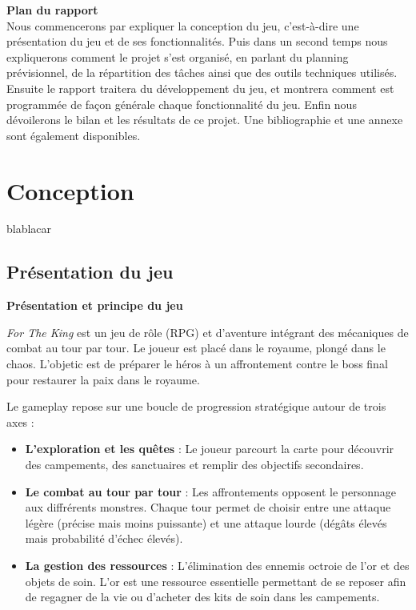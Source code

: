 \documentclass[11pt,a4paper]{article}
\begin{document}
\medskip

\textbf{Plan du rapport} \\
Nous commencerons par expliquer la conception du jeu, c'est-à-dire une présentation du jeu et de ses fonctionnalités.
Puis dans un second temps nous expliquerons comment le projet s'est organisé, en parlant du planning prévisionnel, de la répartition des tâches ainsi que des outils techniques utilisés.
Ensuite le rapport traitera du développement du jeu, et montrera comment est programmée de façon générale chaque fonctionnalité du jeu.
Enfin nous dévoilerons le bilan et les résultats de ce projet.
Une bibliographie et une annexe sont également disponibles.

\section{Conception}

blablacar

\subsection{Présentation du jeu}

\textbf{Présentation et principe du jeu}

\noindent\textit{For The King} est un jeu de rôle (RPG) et d'aventure intégrant des mécaniques de combat au tour par tour. 
Le joueur est placé dans le royaume, plongé dans le chaos. 
L'objetic est de préparer le héros à un affrontement contre le boss final pour restaurer la paix dans le royaume. 

Le gameplay repose sur une boucle de progression stratégique autour de trois axes : 

\begin{itemize}
	\item \textbf{L'exploration et les quêtes} : Le joueur parcourt la carte pour découvrir des campements, des sanctuaires et remplir des objectifs secondaires.
	\item \textbf{Le combat au tour par tour} : Les affrontements opposent le personnage aux diffrérents monstres. Chaque tour permet de choisir entre une attaque légère (précise mais moins puissante) et une attaque lourde (dégâts élevés mais probabilité d'échec élevés).
	\item \textbf{La gestion des ressources} : L'élimination des ennemis octroie de l'or et des objets de soin. L'or est une ressource essentielle permettant de se reposer afin de regagner de la vie ou d'acheter des kits de soin dans les campements.
\end{itemize} 
\end{document}
